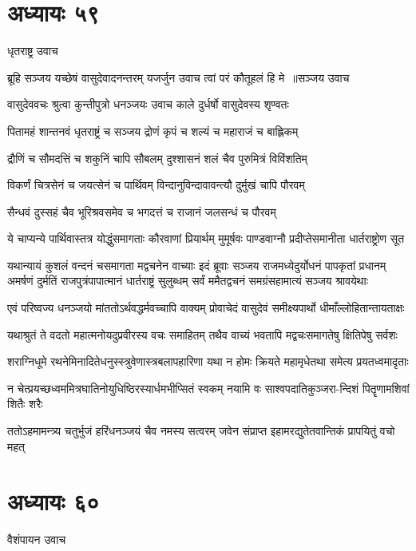 \chapter{अध्यायः ५९}
\twolineshloka
{धृतराष्ट्र उवाच}
{}


\threelineshloka
{ब्रूहि सञ्जय यच्छेषं वासुदेवादनन्तरम्}
{यजर्जुन उवाच त्वां परं कौतूहलं हि मे ॥सञ्जय उवाच}
{}


\twolineshloka
{वासुदेववचः श्रुत्वा कुन्तीपुत्रो धनञ्जयः}
{उवाच काले दुर्धर्षो वासुदेवस्य शृण्वतः}


\twolineshloka
{पितामहं शान्तनवं धृतराष्ट्रं च सञ्जय}
{द्रोणं कृपं च शल्यं च महाराजं च बाह्लिकम्}


\twolineshloka
{द्रौणिं च सौमदत्तिं च शकुनिं चापि सौबलम्}
{दुश्शासनं शलं चैव पुरुमित्रं विविंशतिम्}


\twolineshloka
{विकर्णं चित्रसेनं च जयत्सेनं च पार्थिवम्}
{विन्दानुविन्दावावन्त्यौ दुर्मुखं चापि पौरवम्}


\twolineshloka
{सैन्धवं दुस्सहं चैव भूरिश्रवसमेव च}
{भगदत्तं च राजानं जलसन्धं च पौरवम्}


\twolineshloka
{ये चाप्यन्ये पार्थिवास्तत्र योद्धुंसमागताः कौरवाणां प्रियार्थम्}
{मुमूर्षवः पाण्डवाग्नौ प्रदीप्तेसमानीता धार्तराष्ट्रोण सूत}


यथान्यायं कुशलं वन्दनं चसमागता मद्वचनेन वाच्याः
\threelineshloka
{इदं ब्रूवाः सञ्जय राजमध्येदुर्योधनं पापकृतां प्रधानम्}
{अमर्षणं दुर्मतिं राजपुत्रंपापात्मानं धार्तराष्ट्रं सुलुब्धम्}
{सर्वं ममैतद्वचनं समग्रंसहामात्यं सञ्जय श्रावयेथाः}


\twolineshloka
{एवं परिष्वज्य धनञ्जयो मांततोऽर्थवद्धर्मवच्चापि वाक्यम्}
{प्रोवाचेदं वासुदेवं समीक्ष्यपार्थो धीमाँल्लोहितान्तायताक्षः}


\twolineshloka
{यथाश्रुतं ते वदतो महात्मनोयदुप्रवीरस्य वचः समाहितम्}
{तथैव वाच्यं भवतापि मद्वचःसमागतेषु क्षितिपेषु सर्वशः}


\twolineshloka
{शराग्निधूमे रथनेमिनादितेधनुस्स्त्रुवेणास्त्रबलापहारिणा}
{यथा न होमः क्रियते महामृधेतथा समेत्य प्रयतध्वमादृताः}


\twolineshloka
{न चेत्प्रयच्छध्वममित्रघातिनोयुधिष्ठिरस्यार्धमभीप्सितं स्वकम्}
{नयामि वः साश्वपदातिकुञ्जरा-न्दिशं पितॄणामशिवां शितैः शरैः}


\twolineshloka
{ततोऽहमामन्त्र्य चतुर्भुजं हरिंधनञ्जयं चैव नमस्य सत्वरम्}
{जवेन संप्राप्त इहामरद्युतेतवान्तिकं प्रापयितुं वचो महत्}


\chapter{अध्यायः ६०}
\twolineshloka
{वैशंपायन उवाच}
{}


